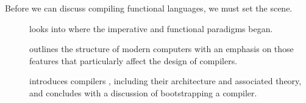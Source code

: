 
\label{background:overview}
Before we can discuss compiling functional languages, we must set the scene. 
\begin{description}
\item[] looks into where the imperative and functional paradigms began.
\item[] outlines the structure of modern computers with an emphasis on those features that particularly affect the design of compilers.
\item[] introduces compilers%
, including their architecture and associated theory, and concludes with a discussion of bootstrapping a compiler.
\end{description}